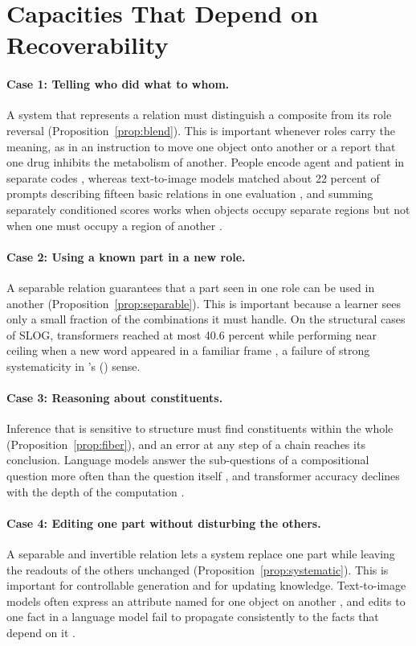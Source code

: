 \documentclass{article}
\theoremstyle{definition}
\theoremstyle{plain}
\theoremstyle{remark}
\begin{document}
\section{Capacities That Depend on Recoverability}
\label{app:cases}

\paragraph{Case 1: Telling who did what to whom.} A system that
represents a relation must distinguish a composite from its role
reversal (Proposition~\ref{prop:blend}). This is important whenever
roles carry the meaning, as in an instruction to move one object onto
another or a report that one drug inhibits the metabolism of another.
People encode agent and patient in separate codes \citep{frankland2015},
whereas text-to-image models matched about 22 percent of prompts
describing fifteen basic relations in one evaluation \citep{conwell2022},
and summing separately conditioned scores works when objects occupy
separate regions but not when one must occupy a region of another
\citep{liu2022composable,anonymous2026seen}.

\paragraph{Case 2: Using a known part in a new role.} A separable
relation guarantees that a part seen in one role can be used in another
(Proposition~\ref{prop:separable}). This is important because a learner
sees only a small fraction of the combinations it must handle. On the
structural cases of SLOG, transformers reached at most 40.6 percent
while performing near ceiling when a new word appeared in a familiar
frame \citep{li2023slog}, a failure of strong systematicity in
\citeauthor{hadley1994}'s (\citeyear{hadley1994}) sense.

\paragraph{Case 3: Reasoning about constituents.} Inference that is
sensitive to structure must find constituents within the whole
(Proposition~\ref{prop:fiber}), and an error at any step of a chain
reaches its conclusion. Language models answer the sub-questions of a
compositional question more often than the question itself
\citep{press2023}, and transformer accuracy declines with the depth of
the computation \citep{dziri2023}.

\paragraph{Case 4: Editing one part without disturbing the others.} A
separable and invertible relation lets a system replace one part while
leaving the readouts of the others unchanged
(Proposition~\ref{prop:systematic}). This is important for controllable
generation and for updating knowledge. Text-to-image models often
express an attribute named for one object on another
\citep{rassin2022,huang2023t2i}, and edits to one fact in a language
model fail to propagate consistently to the facts that depend on it
\citep{cohen2024}.
\end{document}
